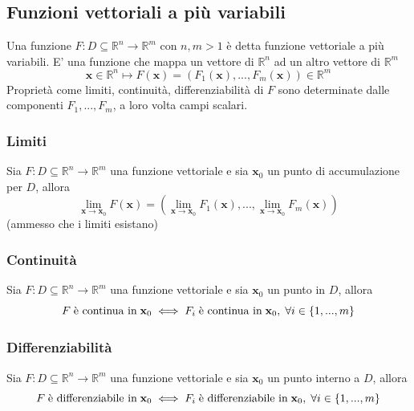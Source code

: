         \subsection{Funzioni vettoriali a più variabili}
            Una funzione $F: D \subseteq \mathbb{R}^{n} \rightarrow \mathbb{R}^{m}$ con $n, m > 1$ è detta funzione vettoriale a più variabili. E' una funzione che mappa un vettore di $\mathbb{R}^{n}$ ad un altro vettore di $\mathbb{R}^{m}$
            \[
                \mathbf{x} \in \mathbb{R}^{n} \mapsto F(\mathbf{x}) = (F_{1}(\mathbf{x}), ..., F_{m}(\mathbf{x})) \in \mathbb{R}^{m}
            \]
            Proprietà come limiti, continuità, differenziabilità di $F$ sono determinate dalle componenti $F_{1}, ..., F_{m}$, a loro volta campi scalari.

            \subsubsection{Limiti}
                Sia $F: D \subseteq \mathbb{R}^{n} \rightarrow \mathbb{R}^{m}$ una funzione vettoriale e sia $\mathbf{x}_0$ un punto di accumulazione per $D$, allora
                \[
                    \lim_{\mathbf{x} \rightarrow \mathbf{x}_0} F(\mathbf{x}) = (\lim_{\mathbf{x} \rightarrow \mathbf{x}_0} F_{1}(\mathbf{x}), ..., \lim_{\mathbf{x} \rightarrow \mathbf{x}_0} F_{m}(\mathbf{x}))
                \]
                (ammesso che i limiti esistano)

            \subsubsection{Continuità}
                Sia $F: D \subseteq \mathbb{R}^{n} \rightarrow \mathbb{R}^{m}$ una funzione vettoriale e sia $\mathbf{x}_0$ un punto in $D$, allora
                \[
                    F \; \textnormal{è continua in} \; \mathbf{x}_0 \iff F_{i} \; \textnormal{è continua in} \; \mathbf{x}_0, \; \forall i \in \{1, ..., m\}
                \]

            \subsubsection{Differenziabilità}
                Sia $F: D \subseteq \mathbb{R}^{n} \rightarrow \mathbb{R}^{m}$ una funzione vettoriale e sia $\mathbf{x}_0$ un punto interno a $D$, allora
                \[
                    F \; \textnormal{è differenziabile in} \; \mathbf{x}_0 \iff F_{i} \; \textnormal{è differenziabile in} \; \mathbf{x}_0, \; \forall i \in \{1, ..., m\}
                \]

